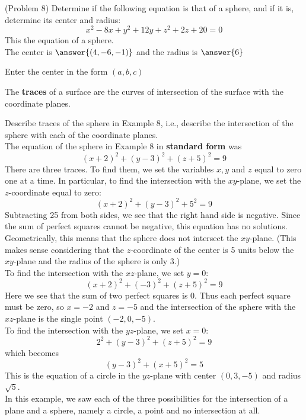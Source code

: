 \documentclass[handout]{ximera}
\begin{document}
\begin{problem}(Problem 8)
Determine if the following equation is that of a sphere, and if it is, determine its center and radius:
\[
x^2 -8x + y^2 + 12y + z^2 + 2z + 20 = 0
\]
This  the equation of a sphere.\\
The center is $\answer{(4,-6,-1)}$ and the radius is $\answer{6}$
\begin{hint}
Enter the center in the form $(a, b, c)$
\end{hint}
\end{problem}

The {\bf traces} of a surface are the curves of intersection of the surface with the coordinate planes.
\begin{example}[Example 9]
Describe traces of the sphere in Example 8, i.e., describe the intersection of the sphere with each of the coordinate planes.\\
The equation of the sphere in Example 8 in {\bf standard form} was
\[
(x+2)^2 +(y-3)^2 + (z+5)^2 = 9
\]
There are three traces. To find them, we set the variables $x, y$ and $z$ equal to zero one at a time.
In particular, to find the intersection with the $xy$-plane, we set the $z$-coordinate equal to zero:
\[
(x+2)^2 +(y-3)^2 + 5^2 = 9
\]
Subtracting 25 from both sides, we see that the right hand side is negative.  
Since the sum of perfect squares cannot be negative, this equation has no solutions.
Geometrically, this means that the sphere does not intersect the $xy$-plane. 
(This makes sense considering that the $z$-coordinate of the center is 5 units 
below the $xy$-plane and the radius of the sphere is only 3.)\\
To find the intersection with the $xz$-plane, we set $y = 0$:
\[
(x+2)^2 + (-3)^2 + (z+5)^2 = 9
\]
Here we see that the sum of two perfect squares is 0.  Thus each perfect square must be zero, so $x = -2$ and $z = -5$ and 
the intersection of the sphere with the $xz$-plane is the single point $(-2, 0, -5)$.\\
To find the intersection with the $yz$-plane, we set $x = 0$:
\[
2^2 + (y-3)^2 + (z+5)^2 = 9
\]
which becomes
\[
(y-3)^2 + (x+5)^2 = 5
\]
This is the equation of a circle in the $yz$-plane with center $(0, 3, -5)$ and radius $\sqrt 5$.\\
In this example, we saw each of the three possibilities for the intersection of a 
plane and a sphere, namely a circle, a point and no intersection at all.
\end{example}
\end{document}
